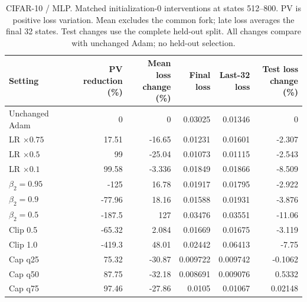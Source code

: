 \begin{table}[t]
\centering
\small
\setlength{\tabcolsep}{4pt}
\begin{tabular}{lrrrrr}
\toprule
Setting & \shortstack{PV reduction\\(\%)} & \shortstack{Mean loss\\change (\%)} & \shortstack{Final\\loss} & \shortstack{Last-32\\loss} & \shortstack{Test loss\\change (\%)} \\
\midrule
Unchanged Adam & 0 & 0 & 0.03025 & 0.01346 & 0 \\
LR $\times0.75$ & 17.51 & -16.65 & 0.01231 & 0.01601 & -2.307 \\
LR $\times0.5$ & 99 & -25.04 & 0.01073 & 0.01115 & -2.543 \\
LR $\times0.1$ & 99.58 & -3.336 & 0.01849 & 0.01866 & -8.509 \\
$\beta_2=0.95$ & -125 & 16.78 & 0.01917 & 0.01795 & -2.922 \\
$\beta_2=0.9$ & -77.96 & 18.16 & 0.01588 & 0.01931 & -3.876 \\
$\beta_2=0.5$ & -187.5 & 127 & 0.03476 & 0.03551 & -11.06 \\
Clip 0.5 & -65.32 & 2.084 & 0.01669 & 0.01675 & -3.119 \\
Clip 1.0 & -419.3 & 48.01 & 0.02442 & 0.06413 & -7.75 \\
Cap q25 & 75.32 & -30.87 & 0.009722 & 0.009742 & -0.1062 \\
Cap q50 & 87.75 & -32.18 & 0.008691 & 0.009076 & 0.5332 \\
Cap q75 & 97.46 & -27.86 & 0.0105 & 0.01067 & 0.02148 \\
\bottomrule
\end{tabular}
\caption{CIFAR-10 / MLP. Matched initialization-0 interventions at states 512--800. PV is positive loss variation. Mean excludes the common fork; late loss averages the final 32 states. Test changes use the complete held-out split. All changes compare with unchanged Adam; no held-out selection.}
\end{table}

